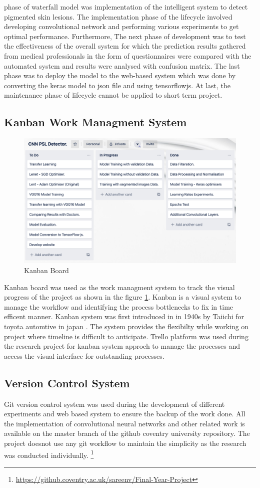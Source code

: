 phase of waterfall model was implementation of the intelligent system to detect pigmented skin
lesions. The implementation phase of the lifecycle involved developing convolutional network and
performing various experiments to get optimal performance. Furthermore, The next phase of
development was to test the effectiveness of the overall system for which the prediction results
gathered from medical professionals in the form of questionnaires were compared with the
automated system and results were analysed with confusion matrix. The last phase was to deploy
the model to the web-based system which was done by converting the keras model to json file and
using tensorflowjs. At last, the maintenance phase of lifecycle cannot be applied to short term
project.

\pagebreak
\subsection{Kanban Work Managment System}
\begin{figure}[!htp]
    \centering
    \includegraphics[width=15cm]{Images/Kanban Bords.png}
    \caption{Kanban Board}
    \label{fig:kanban}
\end{figure}
Kanban board was used as the work managment system to track the visual progress 
of the project as shown in the figure \ref{fig:kanban}. Kanban is a visual system 
to manage the workflow and identifying the process bottlenecks to fix in time efficent manner\citep{kban}. 
Kanban system was first introduced in in 1940s by Taiichi for toyota automtive in japan \citep{kban}.
The system provides the flexibilty while working on project where timeline is difficult to 
anticipate. Trello platform was used during the research project for kanban system approch to manage 
the processes and access the visual interface for outstanding processes.
\subsection{Version Control System}
Git version control system was used during the development of different experiments and web based system 
to ensure the backup of the work done. All the implementation of convolutional neural 
networks and other related work is available on the master branch of the github coventry
university repository. The project doesnot use any git workflow to maintain the simplicity as 
the research was conducted individually. 
\footnote{\url{https://github.coventry.ac.uk/sareenv/Final-Year-Project}}
\pagebreak
